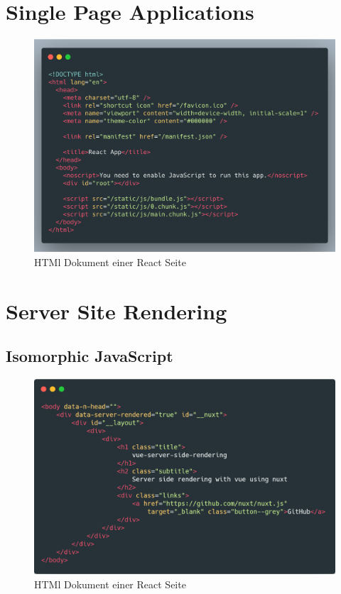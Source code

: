 \documentclass[runningheads]{llncs}
\begin{document}
\section{Single Page Applications}
\label{sec:Single Page Applications}
\begin{figure}[h]
  \centering
  \includegraphics[width=12cm]{images/react-code}
  \caption{HTMl Dokument einer React Seite}
  \label{fig:iwilogo}
\end{figure}


\section{Server Site Rendering}
\label{sec:Server Site Rendering}

\subsection{Isomorphic JavaScript}
\label{subsec:Isomorphic JavaScript}
\begin{figure}[h]
  \centering
  \includegraphics[width=12cm]{images/nuxt-body-first}
  \caption{HTMl Dokument einer React Seite}
  \label{fig:iwilogo}
\end{figure}
\end{document}
